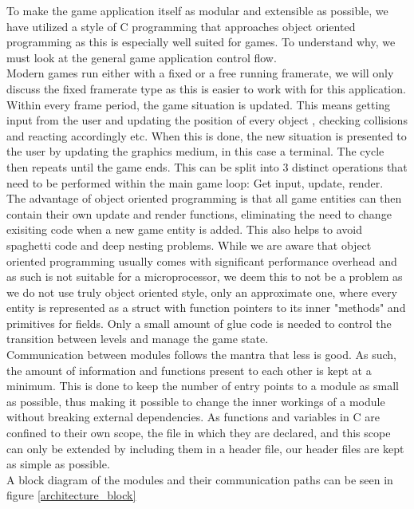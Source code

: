 To make the game application itself as modular and extensible as possible, we have utilized a
style of C programming that approaches object oriented programming as this is especially well
suited for games. To understand why, we must look at the general game application control flow. \\

Modern games run either with a fixed or a free running framerate, we will only discuss the fixed
framerate type as this is easier to work with for this application. Within every frame period, the
game situation is updated. This means getting input from the user and  updating the position of every object
, checking collisions and reacting accordingly etc. When this is done, the new situation is presented to the
 user by updating the graphics medium, in this case a terminal. The cycle then repeats until the game
ends. This can be split into 3 distinct operations that need to be performed within the main game loop:
Get input, update, render. \\

The advantage of object oriented programming is that all game entities can then contain their own
update and render functions, eliminating the need to change exisiting code when a new game entity is added.
This also helps to avoid spaghetti code and deep nesting problems. While we are aware that object oriented
programming usually comes with significant performance overhead and as such is not suitable for a microprocessor,
we deem this to not be a problem as we do not use truly object oriented style, only an approximate one, where every
entity is represented as a struct with function pointers to its inner "methods" and primitives for fields.
Only a small amount of glue code is needed to control the transition between levels and manage the game state. \\

Communication between modules follows the mantra that less is good. As such, the amount of information and functions
present to each other is kept at a minimum. This is done to keep the number of entry points to a module as small
as possible, thus making it possible to change the inner workings of a module without breaking external dependencies.
As functions and variables in C are confined to their own scope, the file in which they are declared, and this
scope can only be extended by including them in a header file, our header files are kept as simple as possible. \\

A block diagram of the modules and their communication paths can be seen in figure \ref{architecture_block}

